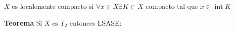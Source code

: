\begin{define}
	$ X $ es localemente compacto si $ \forall x \in X \exists K \subset X $ compacto tal que $ x \in \operatorname{int}K $
\end{define}

\textbf{Teorema} Si $ X $ es $ T_2 $ entonces LSASE:

